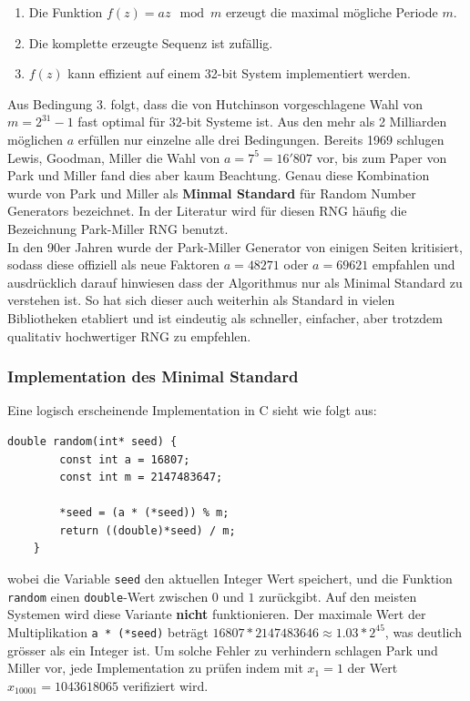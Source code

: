 \documentclass{book}
\begin{document}
\begin{refsection}
\begin{enumerate}
	\item Die Funktion $f(z) = a z \mod m$ erzeugt die maximal mögliche Periode $m$.
	\item Die komplette erzeugte Sequenz ist zufällig.
	\item $f(z)$ kann effizient auf einem 32-bit System implementiert werden.
\end{enumerate}

Aus Bedingung 3. folgt, dass die von Hutchinson \cite{rng:Hutchinson1966} vorgeschlagene Wahl von $m = 2^{31} - 1$ fast optimal für 32-bit Systeme ist. Aus den mehr als 2 Milliarden möglichen $a$ erfüllen nur einzelne alle drei Bedingungen. Bereits 1969 schlugen Lewis, Goodman, Miller \cite{rng:LewisGoodmanMiller1969} die Wahl von $a = 7^5 = 16'807$ vor, bis zum Paper von Park und Miller fand dies aber kaum Beachtung. Genau diese Kombination wurde von Park und Miller als \textbf{Minmal Standard}  für Random Number Generators bezeichnet. In der Literatur wird für diesen RNG häufig die Bezeichnung Park-Miller RNG benutzt. \\

In den 90er Jahren wurde der Park-Miller Generator von einigen Seiten kritisiert, sodass diese offiziell als neue Faktoren $a = 48271$ oder $a = 69621$ empfahlen und ausdrücklich darauf hinwiesen dass der Algorithmus nur als Minimal Standard zu verstehen ist. So hat sich dieser auch weiterhin als Standard in vielen Bibliotheken etabliert und ist eindeutig als schneller, einfacher, aber trotzdem qualitativ hochwertiger RNG zu empfehlen.

\subsubsection{Implementation des Minimal Standard}
Eine logisch erscheinende Implementation in C sieht wie folgt aus:
\begin{lstlisting}[style=C]
	double random(int* seed) {
		const int a = 16807;
		const int m = 2147483647;
		
		*seed = (a * (*seed)) % m;
		return ((double)*seed) / m;
	}
\end{lstlisting}
wobei die Variable \texttt{seed} den aktuellen Integer Wert speichert, und die Funktion \texttt{random} einen \texttt{double}-Wert zwischen $0$ und $1$ zurückgibt. Auf den meisten Systemen wird diese Variante \textbf{nicht} funktionieren. Der maximale Wert der Multiplikation \texttt{a * (*seed)} beträgt $16807*2147483646 \approx 1.03 * 2^{45}$, was deutlich grösser als ein Integer ist. Um solche Fehler zu verhindern schlagen Park und Miller vor, jede Implementation zu prüfen indem mit $x_1 = 1$ der Wert $x_{10001} = 1043618065$ verifiziert wird. \\


\end{refsection}
\end{document}
